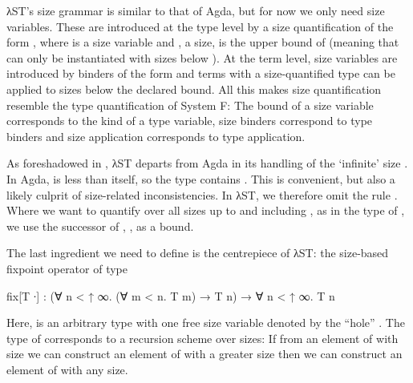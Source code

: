 λST's size grammar is similar to that of Agda, but for now we only need size
variables. These are introduced at the type level by a size quantification of
the form , where  is a size variable and , a
size, is the upper bound of  (meaning that  can only be
instantiated with sizes below ). At the term level, size variables are
introduced by binders of the form  and terms with a
size-quantified type can be applied to sizes below the declared bound. All this
makes size quantification resemble the type quantification of System F: The
bound of a size variable corresponds to the kind of a type variable, size
binders correspond to type binders and size application corresponds to type
application.

As foreshadowed in , λST departs from Agda in its
handling of the \enquote*{infinite} size . In Agda,  is less
than itself, so the type  contains . This is convenient,
but also a likely culprit of size-related inconsistencies. In λST, we therefore
omit the rule . Where we want to quantify over all sizes up to and
including , as in the type of , we use the successor of
, , as a bound.

The last ingredient we need to define  is the centrepiece of λST:
the size-based fixpoint operator  of type
\begin{code}
  fix[T ∙] : (∀ n < ↑ ∞. (∀ m < n. T m) → T n) → ∀ n < ↑ ∞. T n
\end{code}
Here,  is an arbitrary type with one free size variable denoted by the
\enquote{hole} . The type of  corresponds to a recursion
scheme over sizes: If from an element of  with size  we can
construct an element of  with a greater size  then we can
construct an element of  with any size.

